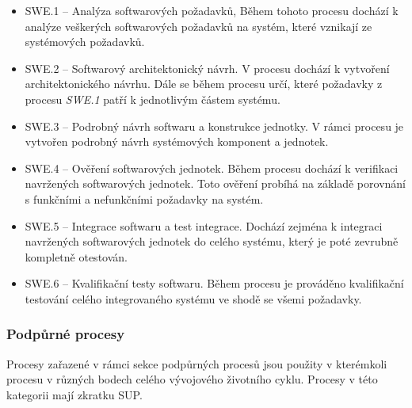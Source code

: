 \documentclass[czech,master,public,dept460,male,cpdeclaration,oneside]{diploma}
\begin{document}
\begin{itemize}
	\item SWE.1 -- Analýza softwarových požadavků, Během tohoto procesu dochází k analýze veškerých softwarových požadavků na systém, které vznikají ze systémových požadavků.
	\item SWE.2 -- Softwarový architektonický návrh. V procesu dochází k vytvoření architektonického návrhu. Dále se během procesu určí, které požadavky z procesu \textit{SWE.1} patří k jednotlivým částem systému. 
	\item SWE.3 -- Podrobný návrh softwaru a konstrukce jednotky. V rámci procesu je vytvořen podrobný návrh systémových komponent a jednotek.
	\item SWE.4 -- Ověření softwarových jednotek. Během procesu dochází k verifikaci navržených softwarových jednotek. Toto ověření probíhá na základě porovnání s funkčními a nefunkčními požadavky na systém.
	\item SWE.5 -- Integrace softwaru a test integrace. Dochází zejména k integraci navržených softwarových jednotek do celého systému, který je poté zevrubně kompletně otestován. 
	\item SWE.6 -- Kvalifikační testy softwaru. Během procesu je prováděno kvalifikační testování celého integrovaného systému ve shodě se všemi požadavky.
\end{itemize}


\subsubsection{Podpůrné procesy}
Procesy zařazené v rámci sekce podpůrných procesů jsou použity v kterémkoli procesu v různých bodech celého vývojového životního cyklu. Procesy v této kategorii mají zkratku SUP.
\end{document}
